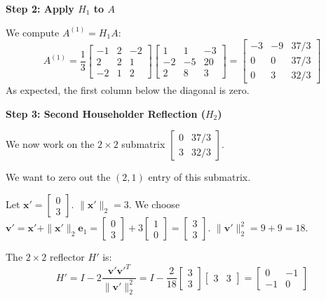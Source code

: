 \documentclass{article}
\newcommand{\0}{{\mathbf{0}}} %
\newcommand{\vect}[1]{\mathbf{#1}}
\begin{document}
\textbf{Step 2: Apply $H_1$ to $A$}

We compute $A^{(1)} = H_1 A$:
$$ A^{(1)} = \frac{1}{3}
\begin{bmatrix} -1 & 2 & -2 \\ 2 & 2 & 1 \\ -2 & 1 & 2
\end{bmatrix}
\begin{bmatrix} 1 & 1 & -3 \\ -2 & -5 & 20 \\ 2 & 8 & 3
\end{bmatrix} =
\begin{bmatrix} -3 & -9 & 37/3 \\ 0 & 0 & 37/3 \\ 0 & 3 & 32/3
\end{bmatrix} $$
As expected, the first column below the diagonal is zero.

\textbf{Step 3: Second Householder Reflection ($H_2$)}

We now work on the $2 \times 2$ submatrix $
\begin{bmatrix} 0 & 37/3 \\ 3 & 32/3
\end{bmatrix}$.

We want to zero out the $(2,1)$ entry of this submatrix.

Let $\vect{x}' =
\begin{bmatrix} 0 \\ 3
\end{bmatrix}$. $\|\vect{x}'\|_2 = 3$.
We choose $\vect{v}' = \vect{x}' + \|\vect{x}'\|_2 \vect{e}_1 =
\begin{bmatrix} 0 \\ 3
\end{bmatrix} + 3
\begin{bmatrix} 1 \\ 0
\end{bmatrix} =
\begin{bmatrix} 3 \\ 3
\end{bmatrix}$.
$\|\vect{v}'\|_2^2 = 9 + 9 = 18$.

The $2 \times 2$ reflector $H'$ is:
$$
H' = I - 2 \frac{\vect{v}' \vect{v}'^T}{\|\vect{v}'\|_2^2} = I - \frac{2}{18}
\begin{bmatrix} 3 \\ 3
\end{bmatrix}
\begin{bmatrix} 3 & 3
\end{bmatrix} =
\begin{bmatrix} 0 & -1 \\ -1 & 0
\end{bmatrix}
$$
\end{document}
